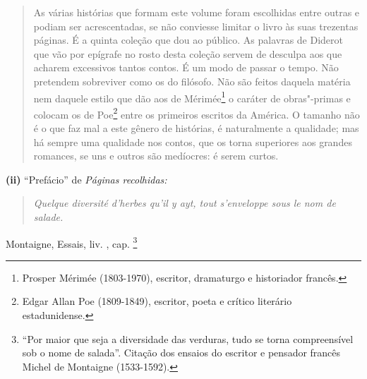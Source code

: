 \begin{quote}
As várias histórias que formam este volume foram escolhidas entre outras
e podiam ser acrescentadas, se não conviesse limitar o livro às suas
trezentas páginas. É a quinta coleção que dou ao público. As palavras de
Diderot que vão por epígrafe no rosto desta coleção servem de desculpa
aos que acharem excessivos tantos contos. É um modo de passar o tempo.
Não pretendem sobreviver como os do filósofo. Não são feitos daquela
matéria nem daquele estilo que dão aos de Mérimée\footnote{Prosper
  Mérimée (1803-1970), escritor, dramaturgo e historiador francês.} o
caráter de obras"-primas e colocam os de Poe\footnote{Edgar Allan Poe
  (1809-1849), escritor, poeta e crítico literário estadunidense.} entre
os primeiros escritos da América. O tamanho não é o que faz mal a este
gênero de histórias, é naturalmente a qualidade; mas há sempre uma
qualidade nos contos, que os torna superiores aos grandes romances, se
uns e outros são medíocres: é serem curtos.
\end{quote}

\bigskip

\textbf{(ii)} ``Prefácio'' de \emph{Páginas recolhidas: }

\begin{quote}
\emph{Quelque diversité d'herbes qu'il y ayt, tout s'enveloppe sous le
nom de salade. }
\end{quote}

\begin{flushright}
Montaigne, Essais, liv. , cap. \footnote{``Por maior que seja a
  diversidade das verduras, tudo se torna compreensível sob o nome de
  salada''. Citação dos ensaios do escritor e pensador francês Michel de
  Montaigne (1533-1592).}
\end{flushright}

